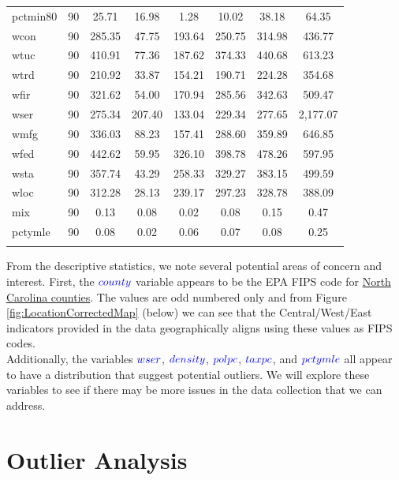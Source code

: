 \begin{table}[!htbp]
\begin{tabular}{@{\extracolsep{5pt}}lccccccc}
		pctmin80 & 90 & 25.71 & 16.98 & 1.28 & 10.02 & 38.18 & 64.35 \\ 
		wcon & 90 & 285.35 & 47.75 & 193.64 & 250.75 & 314.98 & 436.77 \\ 
		wtuc & 90 & 410.91 & 77.36 & 187.62 & 374.33 & 440.68 & 613.23 \\ 
		wtrd & 90 & 210.92 & 33.87 & 154.21 & 190.71 & 224.28 & 354.68 \\ 
		wfir & 90 & 321.62 & 54.00 & 170.94 & 285.56 & 342.63 & 509.47 \\ 
		wser & 90 & 275.34 & 207.40 & 133.04 & 229.34 & 277.65 & 2,177.07 \\ 
		wmfg & 90 & 336.03 & 88.23 & 157.41 & 288.60 & 359.89 & 646.85 \\ 
		wfed & 90 & 442.62 & 59.95 & 326.10 & 398.78 & 478.26 & 597.95 \\ 
		wsta & 90 & 357.74 & 43.29 & 258.33 & 329.27 & 383.15 & 499.59 \\ 
		wloc & 90 & 312.28 & 28.13 & 239.17 & 297.23 & 328.78 & 388.09 \\ 
		mix & 90 & 0.13 & 0.08 & 0.02 & 0.08 & 0.15 & 0.47 \\ 
		pctymle & 90 & 0.08 & 0.02 & 0.06 & 0.07 & 0.08 & 0.25 \\ 
		\hline \\[-1.8ex] 
	\end{tabular} 
\end{table} 

From the descriptive statistics, we note several potential areas of concern and interest.  First, the $\textcolor{Blue}{county}$ variable appears to be the EPA FIPS code for \href{https://en.wikipedia.org/wiki/List_of_counties_in_North_Carolina}{North Carolina counties}.  The values are odd numbered only and from Figure \ref{fig:LocationCorrectedMap} (below) we can see that the Central/West/East indicators provided in the data geographically aligns using these values as FIPS codes.\\

Additionally, the variables $\textcolor{Blue}{wser}$,  $\textcolor{Blue}{density}$, $\textcolor{Blue}{polpc}$, $\textcolor{Blue}{taxpc}$, and $\textcolor{Blue}{pctymle}$ all appear to have a distribution that suggest potential outliers.  We will explore these variables to see if there may be more issues in the data collection that we can address.

\pagebreak
\section{Outlier Analysis}
\label{sec:Outliers}

